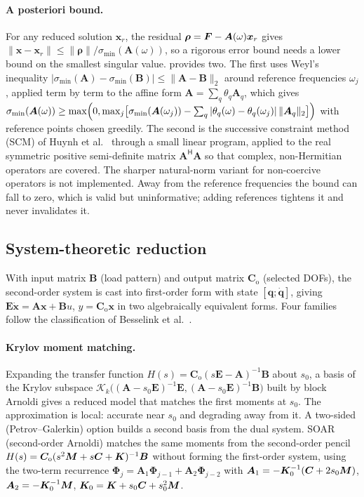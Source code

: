 \paragraph{A posteriori bound.}
For any reduced solution $\bm x_r$, the residual $\bm\rho=\bm{F}-\bm A(\omega)\bm x_r$ gives
$\|\bm x-\bm x_r\|\le\|\bm\rho\|/\sigma_{\min}(\bm A(\omega))$,
so a rigorous error bound needs a lower bound on the smallest singular value. \rom{} provides two. The first uses Weyl's inequality $|\sigma_{\min}(\bm A)-\sigma_{\min}(\bm B)|\le\|\bm A-\bm B\|_2$ around reference frequencies
$\omega_j$, applied term by term to the affine form $\bm A=\sum_q\theta_q\bm A_q$, which gives $\sigma_{\min}(\bm A(\omega))\ge\max\Bigl(0,\max_j\bigl[\sigma_{\min}(\bm A(\omega_j))-\sum_q|\theta_q(\omega)-\theta_q(\omega_j)|\,\|\bm A_q\|_2\bigr]\Bigr)$ with reference points chosen greedily. The second is the successive constraint method (SCM) of Huynh et al.\ \cite{huynh2007scm} through a small linear program, applied to the real symmetric positive semi-definite matrix
$\bm A^{\!\mathsf H}\bm A$ so that complex, non-Hermitian operators are covered. The sharper natural-norm variant for non-coercive operators is not implemented. Away from the reference frequencies the bound can fall to zero, which is valid but uninformative; adding references tightens it and never invalidates it.

\subsection{System-theoretic reduction}\label{sec:rom:sys}
With input matrix $\bm B$ (load pattern) and output matrix $\bm C_{\mathrm o}$ (selected DOFs), the second-order system is cast into first-order form with state $[\bm q;\dot{\bm q}]$, giving $\bm E\dot{\bm x}=\bm A\bm x+\bm Bu$, $y=\bm C_{\mathrm o}\bm x$ in two algebraically equivalent forms.
Four families follow the classification of Besselink et al.\ \cite{besselink2013comparison}.

\paragraph{Krylov moment matching.}
Expanding the transfer function $H(s)=\bm C_{\mathrm o}(s\bm E-\bm A)^{-1}\bm B$ about $s_0$, a basis of the Krylov subspace $\mathcal K_k\bigl((\bm A-s_0\bm E)^{-1}\bm E,(\bm A-s_0\bm E)^{-1}\bm B\bigr)$ built by block Arnoldi gives a reduced model that matches the first moments at $s_0$. The approximation is local: accurate near $s_0$ and degrading away from it. A two-sided (Petrov--Galerkin) option builds a second basis from the dual system.
SOAR (second-order Arnoldi) \cite{bai2005soar} matches the same moments from the second-order pencil $H(s)=\bm C_{\mathrm o}(s^2\bm{M}+s\bm{C}+\bm{K})^{-1}\bm B$ without forming the first-order system, using the two-term recurrence $\bm\Phi_j=\bm A_1\bm\Phi_{j-1}+\bm A_2\bm\Phi_{j-2}$ with
$\bm A_1=-\bm K_0^{-1}(\bm{C}+2s_0\bm{M})$, $\bm A_2=-\bm K_0^{-1}\bm{M}$, $\bm K_0=\bm{K}+s_0\bm{C}+s_0^2\bm{M}$.

